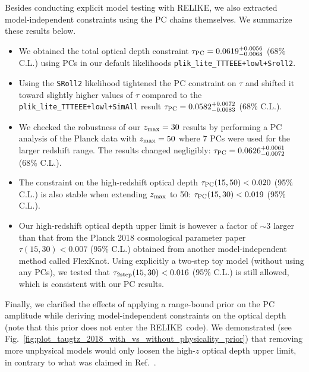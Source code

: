 \documentclass[aps,prd,twocolumn,amsmath,amssymb,showpacs,floatfix,superscriptaddress,nofootinbib]{revtex4-1}
\newcommand{\zmax}{z_{\rm max}}
\newcommand{\relike}{RELIKE}
\begin{document}
{Besides conducting explicit model testing with  \relike, we also extracted model-independent constraints using the PC chains themselves. We summarize these results below.

\begin{itemize}

    \item {We obtained the total optical depth constraint $\tau_{\rm PC} = 0.0619^{+0.0056}_{-0.0068}$ (68\% C.L.) 
    using PCs in our default likelihoods \texttt{plik\_lite\_TTTEEE+lowl+Sroll2}.}
    
    \item {Using the \texttt{SRoll2} likelihood tightened the PC constraint on $\tau$ and shifted it toward slightly higher values of $\tau$ compared to the \texttt{plik\_lite\_TTTEEE+lowl+SimAll} result $\tau_{\rm PC} = 0.0582 ^{+0.0072}_{-0.0083}$ (68\% C.L.).}
    
    \item {We checked the robustness of our $\zmax=30$ results by performing a PC analysis of the Planck data with $\zmax = 50$ where 7 PCs were used for the larger redshift range. The results changed negligibly: $\tau_{\rm PC} = 0.0626 ^{+0.0061}_{-0.0072}$ (68\% C.L.).}
    
    \item{The constraint on the high-redshift optical depth $\tau_{\rm PC}(15, 50) < 0.020$ (95\% C.L.) is also stable when extending $\zmax$ to 50: $\tau_{\rm PC}(15, 30) < 0.019$ (95\% C.L.).}
    
     \item {Our high-redshift optical depth upper limit is however a factor of $\sim3$ larger
     than that from the Planck 2018 cosmological parameter paper $\tau(15, 30) < 0.007$ (95\% C.L.) obtained from another model-independent method called FlexKnot. Using explicitly a two-step toy model (without using any PCs), we tested that $\tau_{\rm 2step}(15, 30) < 0.016$ (95\% C.L.) is still allowed, which is consistent with our PC results.}
     
\end{itemize}

Finally, we clarified the effects of applying a range-bound prior on the PC amplitude while deriving model-independent constraints on the optical depth (note that this prior does not enter the \relike\  code). We demonstrated (see Fig.~\ref{fig:plot_taugtz_2018_with_vs_without_physicality_prior}) that removing more unphysical models would only loosen the high-$z$ optical depth upper limit, in contrary to what was claimed in Ref.~\cite{Millea:2018bko}. \\

}
\end{document}

